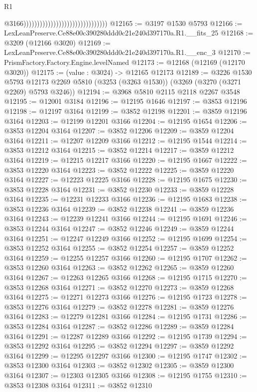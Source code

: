 \begin{lexlean}{R1}
\begin{coremodule}
                                                                  @3166)))))))))))))))))))))))))))))))
@12165 := @3197 @1530 @5793
@12166 := LexLeanPreserve.Ce88e00c390280ddd0c21e240d397170a.R1.__fits_25
@12168 := @3209 (@12166 @3020)
@12169 := LexLeanPreserve.Ce88e00c390280ddd0c21e240d397170a.R1.__enc_3
@12170 := PrismFactory.Factory.Engine.levelNamed
@12173 := @12168 (@12169 (@12170 @3020))
@12175 := (value : @3024) -> @12165 @12173
@12189 := @3226
    @1530
    @5793
    @12173
    @2269
    @5810
    (@3253 (@3263 @1530))
    (@3269 (@3270 (@3271 @2269) @5793 @3246))
@12194 := @3968 @5810 @2115 @2118 @2267 @3548
@12195 := @12001 @3184
@12196 := @12195 @1646
@12197 := @3853 @12196
@12198 := @12197 @3164
@12199 := @3852 @12198
@12201 := @3859 @12196 @3164
@12203 := @12199 @12201 @3166
@12204 := @12195 @1654
@12206 := @3853 @12204 @3164
@12207 := @3852 @12206
@12209 := @3859 @12204 @3164
@12211 := @12207 @12209 @3166
@12212 := @12195 @1544
@12214 := @3853 @12212 @3164
@12215 := @3852 @12214
@12217 := @3859 @12212 @3164
@12219 := @12215 @12217 @3166
@12220 := @12195 @1667
@12222 := @3853 @12220 @3164
@12223 := @3852 @12222
@12225 := @3859 @12220 @3164
@12227 := @12223 @12225 @3166
@12228 := @12195 @1675
@12230 := @3853 @12228 @3164
@12231 := @3852 @12230
@12233 := @3859 @12228 @3164
@12235 := @12231 @12233 @3166
@12236 := @12195 @1683
@12238 := @3853 @12236 @3164
@12239 := @3852 @12238
@12241 := @3859 @12236 @3164
@12243 := @12239 @12241 @3166
@12244 := @12195 @1691
@12246 := @3853 @12244 @3164
@12247 := @3852 @12246
@12249 := @3859 @12244 @3164
@12251 := @12247 @12249 @3166
@12252 := @12195 @1699
@12254 := @3853 @12252 @3164
@12255 := @3852 @12254
@12257 := @3859 @12252 @3164
@12259 := @12255 @12257 @3166
@12260 := @12195 @1707
@12262 := @3853 @12260 @3164
@12263 := @3852 @12262
@12265 := @3859 @12260 @3164
@12267 := @12263 @12265 @3166
@12268 := @12195 @1715
@12270 := @3853 @12268 @3164
@12271 := @3852 @12270
@12273 := @3859 @12268 @3164
@12275 := @12271 @12273 @3166
@12276 := @12195 @1723
@12278 := @3853 @12276 @3164
@12279 := @3852 @12278
@12281 := @3859 @12276 @3164
@12283 := @12279 @12281 @3166
@12284 := @12195 @1731
@12286 := @3853 @12284 @3164
@12287 := @3852 @12286
@12289 := @3859 @12284 @3164
@12291 := @12287 @12289 @3166
@12292 := @12195 @1739
@12294 := @3853 @12292 @3164
@12295 := @3852 @12294
@12297 := @3859 @12292 @3164
@12299 := @12295 @12297 @3166
@12300 := @12195 @1747
@12302 := @3853 @12300 @3164
@12303 := @3852 @12302
@12305 := @3859 @12300 @3164
@12307 := @12303 @12305 @3166
@12308 := @12195 @1755
@12310 := @3853 @12308 @3164
@12311 := @3852 @12310

\end{coremodule}
\end{lexlean}
